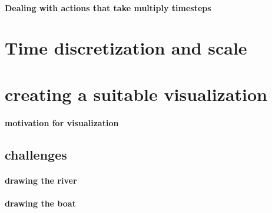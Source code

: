       \paragraph{Dealing with actions that take multiply timesteps}
      
  \section{Time discretization and scale}
    
    
  \section{creating a suitable visualization}
    \paragraph{motivation for visualization}
    \subsection{challenges}
      \paragraph{drawing the river}
      \paragraph{drawing the boat}